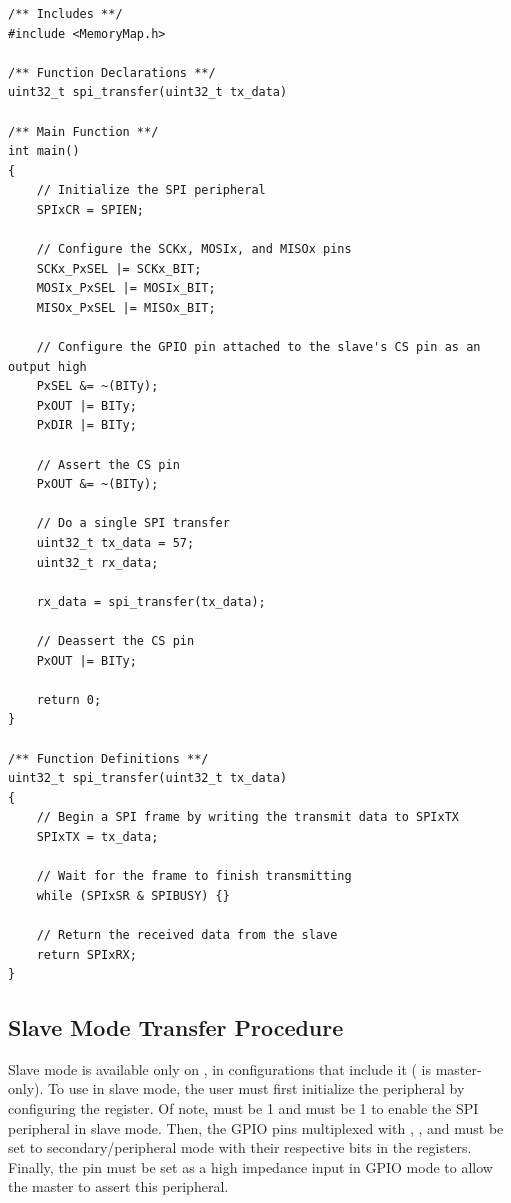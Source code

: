 \begin{lstlisting}[style=customC, label=lst:spi-master-transfer, caption={Example Program for SPI Master Transfers}]
/** Includes **/
#include <MemoryMap.h>

/** Function Declarations **/
uint32_t spi_transfer(uint32_t tx_data)

/** Main Function **/
int main()
{
	// Initialize the SPI peripheral
	SPIxCR = SPIEN;

	// Configure the SCKx, MOSIx, and MISOx pins
	SCKx_PxSEL |= SCKx_BIT;
	MOSIx_PxSEL |= MOSIx_BIT;
	MISOx_PxSEL |= MISOx_BIT;

	// Configure the GPIO pin attached to the slave's CS pin as an output high
	PxSEL &= ~(BITy);
	PxOUT |= BITy;
	PxDIR |= BITy;

	// Assert the CS pin
	PxOUT &= ~(BITy);

	// Do a single SPI transfer
	uint32_t tx_data = 57;
	uint32_t rx_data;

	rx_data = spi_transfer(tx_data);

	// Deassert the CS pin
	PxOUT |= BITy;

	return 0;
}

/** Function Definitions **/
uint32_t spi_transfer(uint32_t tx_data)
{
	// Begin a SPI frame by writing the transmit data to SPIxTX
	SPIxTX = tx_data;

	// Wait for the frame to finish transmitting
	while (SPIxSR & SPIBUSY) {}

	// Return the received data from the slave
	return SPIxRX;
}
\end{lstlisting}



\subsection{Slave Mode Transfer Procedure}

Slave mode is available only on , in configurations that include it ( is master-only). To use  in slave mode, the user must first initialize the peripheral by configuring the  register. Of note,  must be 1 and  must be 1 to enable the SPI peripheral in slave mode. Then, the GPIO pins multiplexed with , , and  must be set to secondary/peripheral mode with their respective bits in the  registers. Finally, the  pin must be set as a high impedance input in GPIO mode to allow the master to assert this  peripheral.

